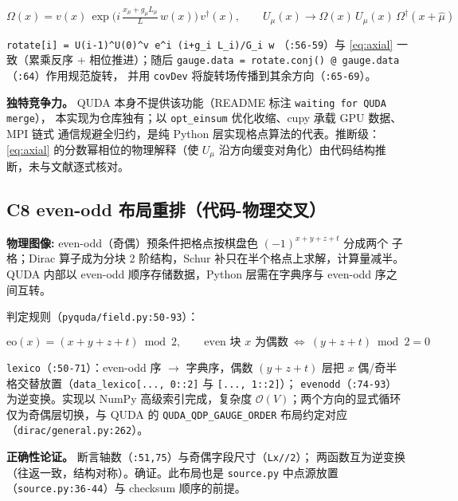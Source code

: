 \documentclass[UTF8]{ctexart}
\begin{document}
\begin{equation}\label{eq:axial}
\Omega(x) = v(x)\,\exp\!\Big(i\,\tfrac{x_\mu + g_\mu L_\mu}{L}\,w(x)\Big)\,v^\dagger(x),
\qquad U_\mu(x) \to \Omega(x)\,U_\mu(x)\,\Omega^\dagger(x+\hat\mu)
\end{equation}

\texttt{rotate[i] = U(i-1)^\dagger\cdots U(0)^\dagger \cdot v \cdot e^{i (i+g_i L_i)/G_i w}}
（\texttt{:56-59}）与 \eqref{eq:axial} 一致（累乘反序 + 相位推进）；随后
\texttt{gauge.data = rotate.conj() @ gauge.data}（\texttt{:64}）作用规范旋转，
并用 \texttt{covDev} 将旋转场传播到其余方向（\texttt{:65-69}）。

\textbf{独特竞争力。} QUDA 本身不提供该功能（README 标注 \texttt{waiting for QUDA merge}），
本实现为仓库独有；以 \texttt{opt\_einsum} 优化收缩、cupy 承载 GPU 数据、MPI 链式
通信规避全归约，是纯 Python 层实现格点算法的代表。\textcolor{phys}{推断}级：\eqref{eq:axial}
的分数幂相位的物理解释（使 $U_\mu$ 沿方向缓变对角化）由代码结构推断，未与文献逐式核对。

\subsection{C8 even-odd 布局重排（代码-物理交叉）}

\begin{physbox}
\textbf{物理图像:} even-odd（奇偶）预条件把格点按棋盘色 $(-1)^{x+y+z+t}$ 分成两个
子格；Dirac 算子成为分块 2 阶结构，Schur 补只在半个格点上求解，计算量减半。
QUDA 内部以 even-odd 顺序存储数据，Python 层需在字典序与 even-odd 序之间互转。
\end{physbox}

判定规则（\texttt{pyquda/field.py:50-93}）：

\begin{equation}\label{eq:eo}
\mathrm{eo}(x) = (x + y + z + t) \bmod 2,\qquad
\text{even 块 } x \text{ 为偶数} \ \Leftrightarrow\ (y+z+t) \bmod 2 = 0
\end{equation}

\texttt{lexico}（\texttt{:50-71}）：even-odd 序 $\to$ 字典序，偶数 $(y+z+t)$ 层把
$x$ 偶/奇半格交替放置（\texttt{data\_lexico[..., 0::2]} 与 \texttt{[..., 1::2]}）；
\texttt{evenodd}（\texttt{:74-93}）为逆变换。实现以 NumPy 高级索引完成，复杂度
$\mathcal{O}(V)$；两个方向的显式循环仅为奇偶层切换，与 QUDA 的
\texttt{QUDA\_QDP\_GAUGE\_ORDER} 布局约定对应（\texttt{dirac/general.py:262}）。

\textbf{正确性论证。} 断言轴数（\texttt{:51,75}）与奇偶字段尺寸（\texttt{Lx//2}）；
两函数互为逆变换（往返一致，结构对称）。\textcolor{accent}{确证}。此布局也是
\texttt{source.py} 中点源放置（\texttt{source.py:36-44}）与 checksum 顺序的前提。
\end{document}
